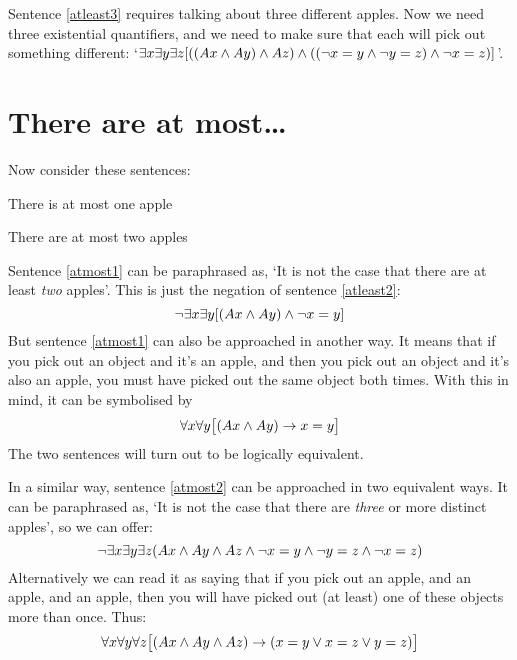 Sentence \ref{atleast3} requires talking about three different apples. Now we need three existential quantifiers, and we need to make sure that each will pick out something different: `$\exists x \exists y\exists z[((Ax \wedge Ay) \wedge Az) \wedge ((\neg x = y \wedge \neg y = z) \wedge \neg x = z)]$'.

\section{There are at most\ldots}
Now consider these sentences:
\begin{earg}
	\item[\ex{atmost1}] There is at most one apple
	\item[\ex{atmost2}] There are at most two apples
\end{earg}
Sentence \ref{atmost1} can be paraphrased as, `It is not the case that there are at least \emph{two} apples'. This is just the negation of sentence \ref{atleast2}: 
$$\neg \exists x \exists y[(Ax \wedge Ay) \wedge \neg x = y]$$
But sentence \ref{atmost1} can also be approached in another way. It means that if you pick out an object and it's an apple, and then you pick out an object and it's also an apple, you must have picked out the same object both times. With this in mind, it can be symbolised by
$$\forall x\forall y\bigl[(Ax \wedge Ay) \rightarrow x=y\bigr]$$
The two sentences will turn out to be logically equivalent.

In a similar way, sentence \ref{atmost2} can be approached in two equivalent ways. It can be paraphrased as, `It is not the case that there are \emph{three} or more distinct apples', so we can offer:
$$\neg \exists x \exists y\exists z(Ax \wedge Ay \wedge Az \wedge \neg x = y \wedge \neg y = z \wedge \neg x = z)$$
Alternatively we can read it as saying that if you pick out an apple, and an apple, and an apple, then you will have picked out (at least) one of these objects more than once. Thus:
$$\forall x\forall y\forall z\bigl[(Ax \wedge Ay \wedge Az) \rightarrow (x=y \vee x=z \vee y=z)\bigr]$$



